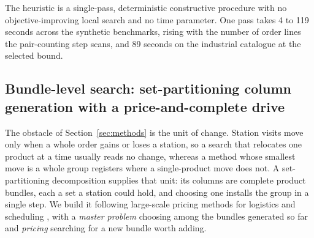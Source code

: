 \documentclass[]{interact}
\begin{document}
The heuristic is a single-pass, deterministic constructive procedure with no objective-improving local search and no time parameter. One pass takes 4 to 119 seconds across the synthetic benchmarks, rising with the number of order lines the pair-counting step scans, and 89 seconds on the industrial catalogue at the selected bound.


\subsection{Bundle-level search: set-partitioning column generation with a price-and-complete drive}\label{sec:cg}
The obstacle of Section~\ref{sec:methods} is the unit of change. Station visits move only when a whole order gains or loses a station, so a search that relocates one product at a time usually reads no change, whereas a method whose smallest move is a whole group registers where a single-product move does not. A set-partitioning decomposition supplies that unit: its columns are complete product bundles, each a set a station could hold, and choosing one installs the group in a single step. We build it following large-scale pricing methods for logistics and scheduling \citep{lubbecke2005selected, muter2022}, with a \emph{master problem} choosing among the bundles generated so far and \emph{pricing} searching for a new bundle worth adding.
\end{document}

